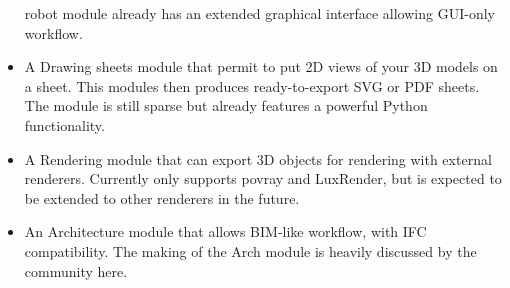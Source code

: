 \begin{itemize}
robot module already has an extended graphical interface allowing GUI-only 
workflow.
\item A Drawing sheets module that permit to put 2D views of your 3D 
models on a sheet. This modules then produces ready-to-export SVG or PDF 
sheets. The module is still sparse but already features a powerful Python 
functionality.
\item A Rendering module that can export 3D objects for rendering with 
external renderers. Currently only supports povray and LuxRender, but is 
expected to be extended to other renderers in the future.
\item An Architecture module that allows BIM-like workflow, with IFC 
compatibility. The making of the Arch module is heavily discussed by the 
community here.
\end{itemize}

